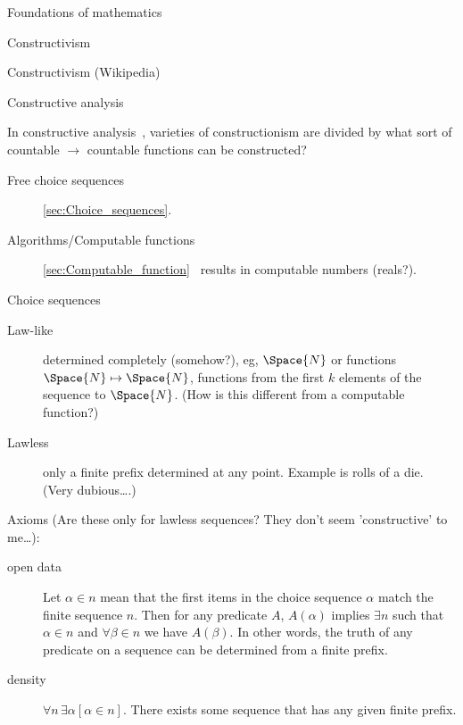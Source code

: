 \begin{plSection}{Foundations of mathematics}
\begin{plSection}{Constructivism}
\begin{plSection}{Constructivism (Wikipedia)}
\end{plSection}%
\begin{plSection}{Constructive analysis}
\label{Constructive analysis}

In constructive 
analysis~\cite{wiki:ConstructiveAnalysis,
Bridger:2019,Henle:2012:RealNumbers},
varieties of constructionism are divided by
what sort of countable $\rightarrow$ countable functions can be 
constructed?~\cite{wiki:ConstructivismPhilosophyOfMathematics}
\begin{description}
\item[Free choice sequences] 
\cref{sec:Choice_sequences}\cite{wiki:ChoiceSequence}.
\item[Algorithms/Computable functions] 
\cref{sec:Computable_function}~\cite{wiki:ComputableFunction}
 results in computable numbers (reals?).
\end{description}

\end{plSection}%
\begin{plSection}{Choice sequences}
\label{sec:Choice_sequences}

\begin{description}
\item[Law-like] determined completely (somehow?),
eg, $\Space{N}$ or functions $\Space{N} \mapsto \Space{N}$,
functions from the first $k$ elements of the sequence to 
$\Space{N}$.
(How is this different from a computable function?)
\item[Lawless] only a finite prefix determined at any point.
Example is rolls of a die. (Very dubious\ldots.)
\end{description}

Axioms 
(Are these only for lawless sequences?
They don't seem 'constructive' to me\ldots):
\begin{description}
\item[open data] Let $\alpha \in n$ mean that the first items
in the choice sequence $\alpha$ match the finite sequence $n$.
Then for any predicate $A$,
$A(\alpha )$ implies  $\exists n$ such that
$\alpha \in n$ and $\forall \beta \in n$ we have $A(\beta )$.
In other words, the truth of any predicate on a sequence can be
determined from a finite prefix.
\item[density] $\forall n\,\exists \alpha [\alpha \in n]$.
There exists some sequence that has any given finite prefix.
\end{description}


\end{plSection}
\end{plSection}
\end{plSection}
